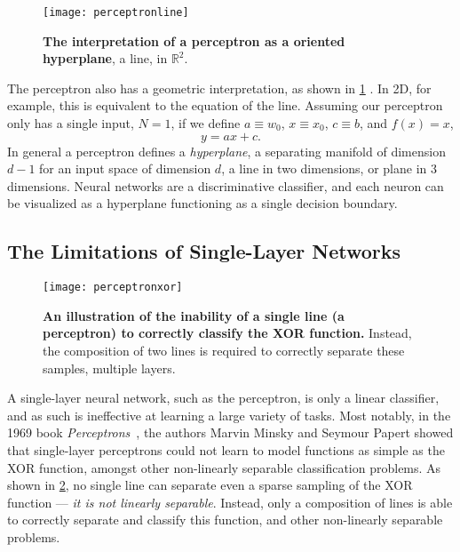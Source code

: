 \documentclass[thesis]{subfiles}
\begin{document}
\begin{figure}[tbp]
\centering
\texttt{[image: perceptronline]}
\caption[The interpretation of a perceptron as a hyperplane]{\textbf{The interpretation of a perceptron as a oriented hyperplane}, \ie{}a line, in $\mathbb{R}^2$.}
\label{fig:hyperplane}
\end{figure}
The perceptron also has a geometric interpretation, as shown in \cref{fig:hyperplane} \citet{Bishop1995}. In 2D, for example, this is equivalent to the equation of the line. Assuming our perceptron only has a single input, \ie{}$N=1$, if we define $a\equiv w_0$, $x \equiv x_0$, $c \equiv b$, and $f(x) = x$,
%
\begin{equation}
y = a x + c.
\end{equation}
%
In general a perceptron defines a \emph{hyperplane}, a separating manifold of dimension $d - 1$ for an input space of dimension $d$, a line in two dimensions, or plane in 3 dimensions. Neural networks are a discriminative classifier, and each neuron can be visualized as a hyperplane functioning as a single decision boundary.

\subsection{The Limitations of Single-Layer Networks}\label{singlelayernetworks}
\begin{figure}[tbp]
\centering
\texttt{[image: perceptronxor]}
\caption[An illustration of the inability of a single line to correctly classify the XOR function]{\textbf{An illustration of the inability of a single line (\ie{}a perceptron) to correctly classify the XOR function.} Instead, the composition of two lines is required to correctly separate these samples, \ie{}multiple layers.}
\label{fig:perceptronxor}
\end{figure}
A single-layer neural network, such as the perceptron, is only a linear classifier, and as such is ineffective at learning a large variety of tasks. Most notably, in the 1969 book \emph{Perceptrons}~\citep{minsky1988perceptrons}, the authors Marvin Minsky and Seymour Papert showed that single-layer perceptrons could not learn to model functions as simple as the XOR function, amongst other non-linearly separable classification problems. As shown in \cref{fig:perceptronxor}, no single line can separate even a sparse sampling of the XOR function --- \ie\emph{it is not linearly separable}. Instead, only a composition of lines is able to correctly separate and classify this function, and other non-linearly separable problems.
\end{document}
